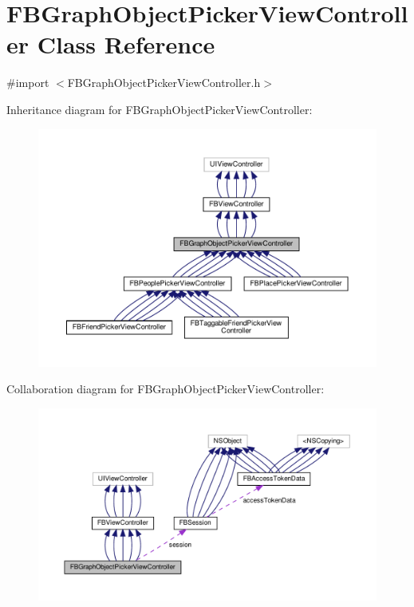 \hypertarget{interfaceFBGraphObjectPickerViewController}{}\section{F\+B\+Graph\+Object\+Picker\+View\+Controller Class Reference}
\label{interfaceFBGraphObjectPickerViewController}


{\ttfamily \#import $<$F\+B\+Graph\+Object\+Picker\+View\+Controller.\+h$>$}



Inheritance diagram for F\+B\+Graph\+Object\+Picker\+View\+Controller\+:
\nopagebreak
\begin{figure}[H]
\begin{center}
\leavevmode
\includegraphics[width=350pt]{interfaceFBGraphObjectPickerViewController__inherit__graph}
\end{center}
\end{figure}


Collaboration diagram for F\+B\+Graph\+Object\+Picker\+View\+Controller\+:
\nopagebreak
\begin{figure}[H]
\begin{center}
\leavevmode
\includegraphics[width=350pt]{interfaceFBGraphObjectPickerViewController__coll__graph}
\end{center}
\end{figure}

